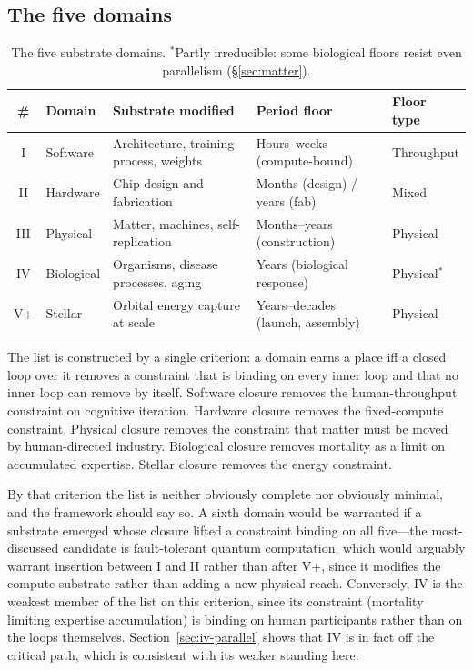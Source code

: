 \documentclass[11pt]{article}
\begin{document}
\subsection{The five domains}
\label{sec:domains}

\begin{table}[h]
\centering
\footnotesize
\begin{tabular}{@{}clL{4.2cm}L{3.6cm}l@{}}
\toprule
\# & Domain & Substrate modified & Period floor & Floor type \\
\midrule
I   & Software   & Architecture, training process, weights & Hours--weeks (compute-bound) & Throughput \\
II  & Hardware   & Chip design and fabrication            & Months (design) / years (fab) & Mixed \\
III & Physical   & Matter, machines, self-replication     & Months--years (construction) & Physical \\
IV  & Biological & Organisms, disease processes, aging    & Years (biological response) & Physical$^{*}$ \\
V+  & Stellar    & Orbital energy capture at scale        & Years--decades (launch, assembly) & Physical \\
\bottomrule
\end{tabular}
\caption{The five substrate domains. $^{*}$Partly irreducible: some biological floors resist even parallelism (\S\ref{sec:matter}).}
\end{table}

The list is constructed by a single criterion: a domain earns a place iff a closed loop over it removes a constraint that is binding on every inner loop and that no inner loop can remove by itself. Software closure removes the human-throughput constraint on cognitive iteration. Hardware closure removes the fixed-compute constraint. Physical closure removes the constraint that matter must be moved by human-directed industry. Biological closure removes mortality as a limit on accumulated expertise. Stellar closure removes the energy constraint.

By that criterion the list is neither obviously complete nor obviously minimal, and the framework should say so. A sixth domain would be warranted if a substrate emerged whose closure lifted a constraint binding on all five---the most-discussed candidate is fault-tolerant quantum computation, which would arguably warrant insertion between I and II rather than after V+, since it modifies the compute substrate rather than adding a new physical reach. Conversely, IV is the weakest member of the list on this criterion, since its constraint (mortality limiting expertise accumulation) is binding on human participants rather than on the loops themselves. Section~\ref{sec:iv-parallel} shows that IV is in fact off the critical path, which is consistent with its weaker standing here.
\end{document}
